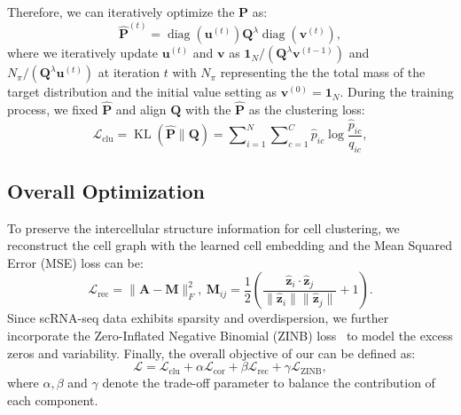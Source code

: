 Therefore, we can iteratively optimize the $\bm{P}$ as:
\begin{equation}
    \hat{\bm{P}}^{(t)}=\operatorname{diag}(\bm{u}^{(t)}) \bm{Q}^\lambda \operatorname{diag}(\bm{v}^{(t)}),
\end{equation}
where we iteratively update  $\bm{u}^{(t)}$ and $\bm{v}$ as $\bm{1}_N / (\bm{Q}^{\lambda}\bm{v}^{(t-1)})$ and $N_\pi / (\bm{Q}^{\lambda}\bm{u}^{(t)})$ at iteration $t$ with $N_\pi$ representing the the total mass of the target distribution and the initial value setting as $\bm{v}^{(0)}=\bm{1}_N$. During the training process, we fixed $\hat{\bm{P}}$ and align $\bm{Q}$ with the $\hat{\bm{P}}$ as the clustering loss:
\begin{equation}
    \mathcal{L}_{\text{clu}}=\operatorname{KL}(\hat{\bm{P}}\|\bm{Q})=\sum\nolimits_{i=1}^N\sum\nolimits_{c=1}^C\hat{p}_{ic}\log\frac{\hat{p}_{ic}}{q_{ic}},
\end{equation}




\subsection{Overall Optimization}
To preserve the intercellular structure information for cell clustering, we reconstruct the cell graph with the learned cell embedding and the Mean Squared Error (MSE) loss can be:
\begin{equation}
    \mathcal{L}_{\text{rec}}=\|\bm{A}-\bm{M}\|_F^2,\ \bm{M}_{ij}=\frac{1}{2}\left(\frac{\hat{\bm{z}}_i\cdot\hat{\bm{z}}_j}{\|\hat{\bm{z}}_i\|\|\hat{\bm{z}}_j\|}+1\right).
\end{equation}
Since scRNA-seq data exhibits sparsity and overdispersion, we further incorporate the Zero-Inflated Negative Binomial (ZINB) loss~\cite{eraslan2019single,xu2025scsiameseclu} to model the excess zeros and variability. Finally, the overall objective of our \method{} can be defined as:
\begin{equation}
    \mathcal{L}=\mathcal{L}_{\text{clu}}+\alpha\mathcal{L}_{\text{cor}}+\beta\mathcal{L}_{\text{rec}}+\gamma\mathcal{L}_{\text{ZINB}},
\end{equation}
where $\alpha,\beta$ and $\gamma$ denote the trade-off parameter to balance the contribution of each component.


